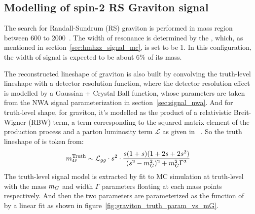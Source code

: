 \subsection{Modelling of spin-2 RS Graviton signal}

The search for Randall-Sundrum (RS) graviton is performed in mass region between 600 to 2000~\gev.
The width of resonance is determined by the \kOverMpl, which, as mentioned in section~\ref{sec:hmhzz_signal_mc}, is set to be 1. 
In this configuration, the width of signal is expected to be about 6\% of its mass.

The reconstructed \mfl lineshape of graviton is also built by convolving the truth-level lineshape with a detector resolution function,
where the detector resolution effect is modelled by a Gaussian + Crystal Ball function, whose parameters are taken from the NWA signal parameterization in section~\ref{sec:signal_nwa}.
And for truth-level shape, for graviton, it's modelled as the product of a relativistic Breit-Wigner (RBW) term, a term corresponding to the squared matrix element of the production process and a parton luminosity term $\mathcal{L}$ as given in ~\cite{Bijnens_2001}.
So the truth lineshape of \mfl is token from:
\begin{equation*}
        m_{4\ell}^{\text{Truth}} \sim \mathcal{L}_{gg} \cdot s^2 \cdot \frac{s(1 + s)(1 + 2s + 2s^2)}{(s^2 - m_{G}^2)^2 + m_{G}^2 \Gamma^2}
\end{equation*}
The truth-level signal model is extracted by fit to MC simulation at truth-level with the mass $m_{G}$ and width $\Gamma$ parameters floating at each mass points respectively.
And then the two parameters are parameterized as the function of \mH by a linear fit as shown in figure~\ref{fig:graviton_truth_param_vs_mG}.
